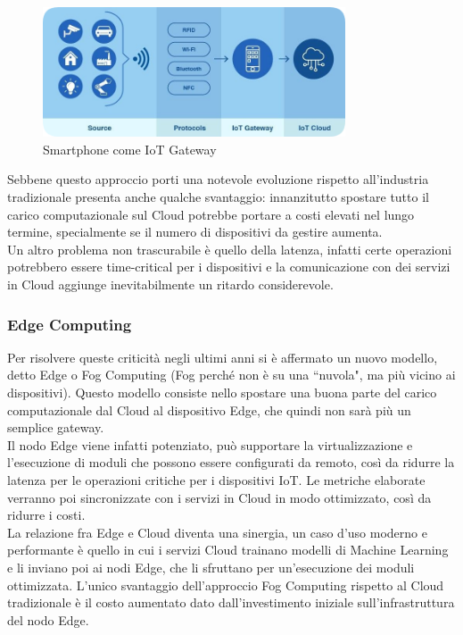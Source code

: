 \FloatBarrier
\begin{figure}[h]
    \centering
    \includegraphics[width=0.8\textwidth]{img/IoT-app.png}
    \caption{Smartphone come IoT Gateway\protect\footnotemark}
    \label{fig:iot}
\end{figure}
\FloatBarrier


Sebbene questo approccio porti una notevole evoluzione rispetto all'industria tradizionale presenta anche qualche svantaggio: innanzitutto spostare tutto il carico computazionale sul Cloud potrebbe portare a costi elevati nel lungo termine, specialmente se il numero di dispositivi da gestire aumenta\cite{Barcelo2016IoT-Cloud}.\\
Un altro problema non trascurabile è quello della latenza, infatti certe operazioni potrebbero essere time-critical per i dispositivi e la comunicazione con dei servizi in Cloud aggiunge inevitabilmente un ritardo considerevole\cite{Shukla2021Improving}.

\subsubsection{Edge Computing}

Per risolvere queste criticità negli ultimi anni si è affermato un nuovo modello, detto Edge o Fog Computing\cite{Hoshikawa2019Edge} (Fog perché non è su una ``nuvola", ma più vicino ai dispositivi). Questo modello consiste nello spostare una buona parte del carico computazionale dal Cloud al dispositivo Edge, che quindi non sarà più un semplice gateway.\\
Il nodo Edge viene infatti potenziato, può supportare la virtualizzazione e l'esecuzione di moduli che possono essere configurati da remoto, così da ridurre la latenza per le operazioni critiche per i dispositivi IoT\cite{Shukla2021Improving}. Le metriche elaborate verranno poi sincronizzate con i servizi in Cloud in modo ottimizzato, così da ridurre i costi.\\
La relazione fra Edge e Cloud diventa una sinergia, un caso d'uso moderno e performante è quello in cui i servizi Cloud trainano modelli di Machine Learning e li inviano poi ai nodi Edge, che li sfruttano per un'esecuzione dei moduli ottimizzata.
L'unico svantaggio dell'approccio Fog Computing rispetto al Cloud tradizionale è il costo aumentato dato dall'investimento iniziale sull'infrastruttura del nodo Edge.\\

